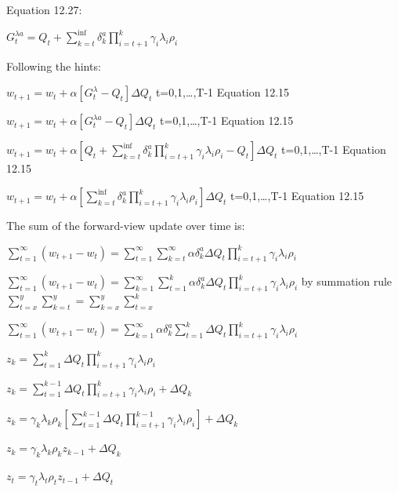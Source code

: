 \documentclass[11pt]{article}
\begin{document}
    \noindent Equation 12.27:

    \noindent $  G_{t}^{\lambda a}  =   Q_{t} + \sum_{k=t}^{\inf} \delta_{k}^{a} \prod_{i=t+1}^{k} \gamma_{i} \lambda_{i} \rho_{i} $

    \hfill \break
    \noindent Following the hints:

    \noindent $ w_{t+1} = w_{t} + \alpha [ G_{t}^{\lambda} - Q_{t}] \Delta Q_{t} $ t=0,1,\ldots,T-1 Equation 12.15

    \noindent $ w_{t+1} = w_{t} + \alpha [ G_{t}^{\lambda a} - Q_{t}] \Delta Q_{t} $ t=0,1,\ldots,T-1 Equation 12.15

    \noindent $ w_{t+1} = w_{t} + \alpha [Q_{t} + \sum_{k=t}^{\inf} \delta_{k}^{a} \prod_{i=t+1}^{k} \gamma_{i} \lambda_{i} \rho_{i} - Q_{t}] \Delta Q_{t} $ t=0,1,\ldots,T-1 Equation 12.15

    \noindent $ w_{t+1} = w_{t} + \alpha [\sum_{k=t}^{\inf} \delta_{k}^{a} \prod_{i=t+1}^{k} \gamma_{i} \lambda_{i} \rho_{i}] \Delta Q_{t} $ t=0,1,\ldots,T-1 Equation 12.15

    \hfill \break
    \noindent The sum of the forward-view update over time is:

    \noindent $ \sum_{t=1}^{\infty} (w_{t+1} - w_t) = \sum_{t=1}^{\infty} \sum_{k=t}^{\infty} \alpha  \delta_{k}^{a} \Delta Q_{t} \prod_{i=t+1}^{k} \gamma_{i} \lambda_{i} \rho_{i}  $

    \noindent $ \sum_{t=1}^{\infty} (w_{t+1} - w_t) = \sum_{k=1}^{\infty} \sum_{t=1}^{k} \alpha  \delta_{k}^{a} \Delta Q_{t} \prod_{i=t+1}^{k} \gamma_{i} \lambda_{i} \rho_{i}  $ by summation rule $ \sum_{t=x}^{y} \sum_{k=t}^{y} = \sum_{k=x}^{y} \sum_{t=x}^{k}  $

    \noindent $ \sum_{t=1}^{\infty} (w_{t+1} - w_t) = \sum_{k=1}^{\infty} \alpha  \delta_{k}^{a} \sum_{t=1}^{k} \Delta Q_{t} \prod_{i=t+1}^{k} \gamma_{i} \lambda_{i} \rho_{i}  $

    \noindent $ z_k = \sum_{t=1}^{k} \Delta Q_{t} \prod_{i=t+1}^{k} \gamma_{i} \lambda_{i} \rho_{i}  $

    \noindent $ z_k = \sum_{t=1}^{k-1} \Delta Q_{t} \prod_{i=t+1}^{k} \gamma_{i} \lambda_{i} \rho_{i} + \Delta Q_{k} $

    \noindent $ z_k = \gamma_{k} \lambda_{k} \rho_{k} [ \sum_{t=1}^{k-1} \Delta Q_{t} \prod_{i=t+1}^{k-1} \gamma_{i} \lambda_{i} \rho_{i} ] + \Delta Q_{k} $

    \noindent $ z_k = \gamma_{k} \lambda_{k} \rho_{k} z_{k-1} + \Delta Q_{k} $

    \noindent $ z_t = \gamma_{t} \lambda_{t} \rho_{t} z_{t-1} + \Delta Q_{t} $
\end{document}
